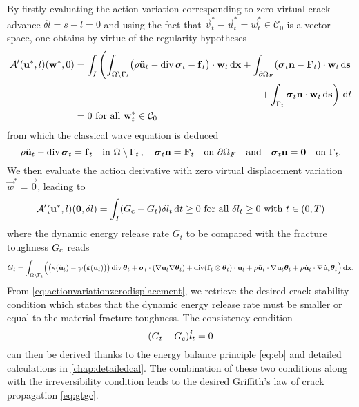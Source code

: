 By firstly evaluating the action variation corresponding to zero virtual crack advance $\delta l=s-l=0$ and using the fact that $\vec{v}_t^*-\vec{u}_t^*=\vec{w}_t^*\in\mathcal{C}_0$ is a vector space, one obtains by virtue of the regularity hypotheses
\begin{equation} \label{eq:actionvariationzerocrackadvance}
\begin{aligned}
\mathcal{A}'(\vec{u}^*,l)(\vec{w}^*,0) &= \int_I\left(\int_\domaint\bigl(\rho\ddot{\vec{u}}_t-\div\sig_t-\vec{f}_t\bigr)\cdot\vec{w}_t\dx+\int_{\partial\Omega_F}(\sig_t\vec{n}-\vec{F}_t)\cdot\vec{w}_t\D{\vec{s}}\right. \\
&\pushright{\left.+\int_{\Gamma_t}\sig_t\vec{n}\cdot\vec{w}_t\D{\vec{s}}\right)\D{t}} \\
&= 0\text{ for all $\vec{w}_t^*\in\mathcal{C}_0$}
\end{aligned}
\end{equation}
from which the classical wave equation is deduced
\begin{equation} \label{eq:classicalwave}
\rho\ddot{\vec{u}}_t-\div\sig_t=\vec{f}_t\quad\text{in }\domaint\,,\quad\sig_t\vec{n}=\vec{F}_t\quad\text{on }\partial\Omega_F\quad\text{and}\quad\sig_t\vec{n}=\vec{0}\quad\text{on }\Gamma_t.
\end{equation}
We then evaluate the action derivative with zero virtual displacement variation $\vec{w}^*=\vec{0}$, leading to
\begin{equation} \label{eq:actionvariationzerodisplacement}
\mathcal{A}'(\vec{u}^*,l)(\vec{0},\delta l)=\int_I(\gc-G_t)\delta l_t\D{t}\geq 0\text{ for all $\delta l_t\geq 0$ with $t\in(0,T)$}
\end{equation}
where the dynamic energy release rate $G_t$ to be compared with the fracture toughness $G_\mathrm{c}$ reads 
\begin{equation} \label{eq:Gt}
G_t=\int_\domaint\Bigl(\bigl(\kappa(\dot{\vec{u}}_t)-\psi\bigl(\eps(\vec{u}_t)\bigr)\bigr)\div\vtheta_t+\sig_t\cdot(\nabla\vec{u}_t\nabla\vtheta_t)+\div(\vec{f}_t\otimes\vtheta_t)\cdot\vec{u}_t+\rho\ddot{\vec{u}}_t\cdot\nabla\vec{u}_t\vtheta_t+\rho\dot{\vec{u}}_t\cdot\nabla\dot{\vec{u}}_t\vtheta_t\Bigr)\dx.
\end{equation}
From \eqref{eq:actionvariationzerodisplacement}, we retrieve the desired crack stability condition which states that the dynamic energy release rate must be smaller or equal to the material fracture toughness. The consistency condition
\[
(G_t-G_\mathrm{c})\dot{l}_t=0
\]
can then be derived thanks to the energy balance principle \eqref{eq:eb} and detailed calculations in \cref{chap:detailedcal}. The combination of these two conditions along with the irreversibility condition leads to the desired Griffith's law of crack propagation \eqref{eq:gtgc}.

